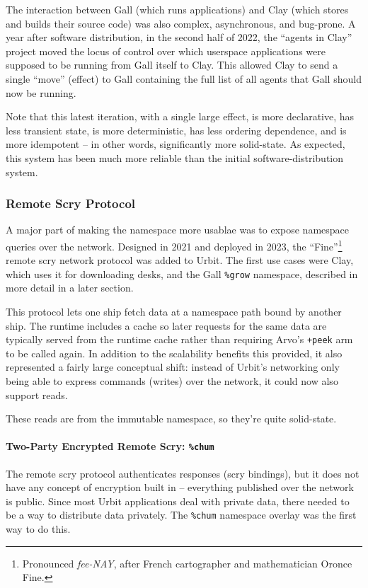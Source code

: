 \documentclass[twoside]{article}
\begin{document}
The interaction between Gall (which runs applications) and Clay (which stores and builds their source code) was also complex, asynchronous, and bug-prone.  A year after software distribution, in the second half of 2022, the ``agents in Clay'' project moved the locus of control over which userspace applications were supposed to be running from Gall itself to Clay.  This allowed Clay to send a single ``move'' (effect) to Gall containing the full list of all agents that Gall should now be running.

Note that this latest iteration, with a single large effect, is more declarative, has less transient state, is more deterministic, has less ordering dependence, and is more idempotent – in other words, significantly more solid-state.  As expected, this system has been much more reliable than the initial software-distribution system.

\subsubsection{Remote Scry Protocol}

A major part of making the namespace more usablae was to expose namespace queries over the network.  Designed in 2021 and deployed in 2023, the ``Fine''\footnote{Pronounced \emph{fee-NAY}, after French cartographer and mathematician Oronce Fine.} remote scry network protocol was added to Urbit.  The first use cases were Clay, which uses it for downloading desks, and the Gall \lstinline[style=inlinecode]{%grow} namespace, described in more detail in a later section.

This protocol lets one ship fetch data at a namespace path bound by another ship.  The runtime includes a cache so later requests for the same data are typically served from the runtime cache rather than requiring Arvo's \lstinline[style=inlinecode]{+peek} arm to be called again.  In addition to the scalability benefits this provided, it also represented a fairly large conceptual shift: instead of Urbit's networking only being able to express commands (writes) over the network, it could now also support reads.

These reads are from the immutable namespace, so they're quite solid-state.

\paragraph{Two-Party Encrypted Remote Scry: \texttt{\%chum}}  The remote scry protocol authenticates responses (scry bindings), but it does not have any concept of encryption built in – everything published over the network is public.  Since most Urbit applications deal with private data, there needed to be a way to distribute data privately.  The \lstinline[style=inlinecode]{%chum} namespace overlay was the first way to do this.
\end{document}
